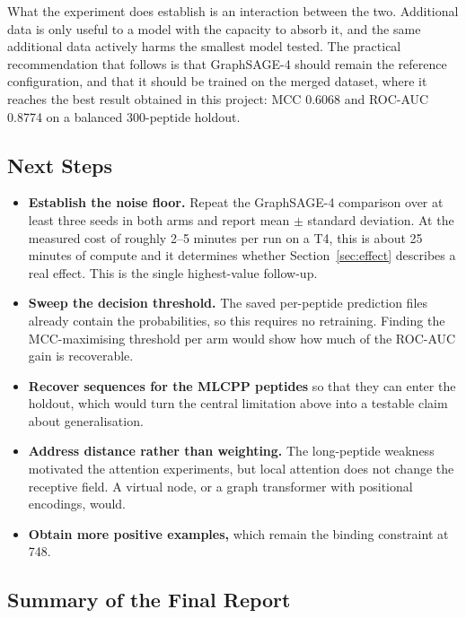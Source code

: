 \documentclass[11pt,a4paper]{article}
\begin{document}
What the experiment does establish is an interaction between the two. Additional data is only useful to a
model with the capacity to absorb it, and the same additional data actively harms the smallest model
tested. The practical recommendation that follows is that GraphSAGE-4 should remain the reference
configuration, and that it should be trained on the merged dataset, where it reaches the best result
obtained in this project: MCC 0.6068 and ROC-AUC 0.8774 on a balanced 300-peptide holdout.

\subsection{Next Steps}
\label{sec:next}
\begin{itemize}
  \item \textbf{Establish the noise floor.} Repeat the GraphSAGE-4 comparison over at least three seeds in
  both arms and report mean $\pm$ standard deviation. At the measured cost of roughly 2--5 minutes per run
  on a T4, this is about 25 minutes of compute and it determines whether Section~\ref{sec:effect} describes
  a real effect. This is the single highest-value follow-up.
  \item \textbf{Sweep the decision threshold.} The saved per-peptide prediction files already contain the
  probabilities, so this requires no retraining. Finding the MCC-maximising threshold per arm would show
  how much of the ROC-AUC gain is recoverable.
  \item \textbf{Recover sequences for the MLCPP peptides} so that they can enter the holdout, which would
  turn the central limitation above into a testable claim about generalisation.
  \item \textbf{Address distance rather than weighting.} The long-peptide weakness motivated the attention
  experiments, but local attention does not change the receptive field. A virtual node, or a graph
  transformer with positional encodings, would.
  \item \textbf{Obtain more positive examples,} which remain the binding constraint at 748.
\end{itemize}

\subsection*{Summary of the Final Report}
\end{document}
